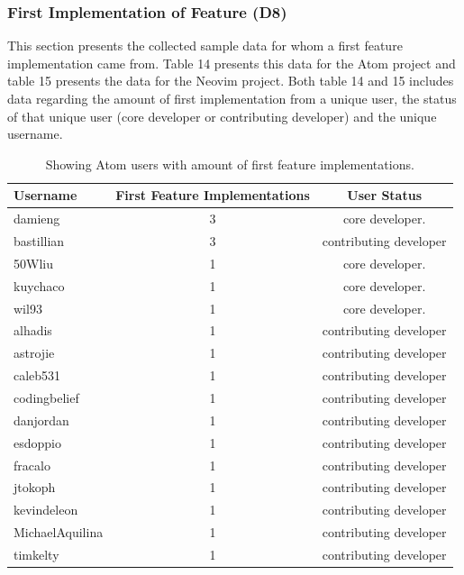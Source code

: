 \documentclass[a4paper,11pt]{article}
\begin{document}
{\FloatBarrier
\subsubsection{First Implementation of Feature (D8)}
This section presents the collected sample data for whom a first feature implementation came from. Table 14 presents this data for the Atom project and table 15 presents the data for the Neovim project. Both table 14 and 15 includes data regarding the amount of first implementation from a unique user, the status of that unique user (core developer or contributing developer) and the unique username.
\begin{table}[h]
	\centering
	\begin{tabular}{ | l | c | c |}
		\hline
		\textbf{Username} 	& \textbf{First Feature Implementations}	& \textbf{User Status}	\\\hline
		damieng 			& 3 								& core developer. 		\\\hline
		bastillian 			& 3 								& contributing developer	\\\hline
		50Wliu			& 1 								& core developer. 		\\\hline
		kuychaco 			& 1 								& core developer. 		\\\hline
		wil93 			& 1 								& core developer. 		\\\hline
		alhadis 			& 1 								& contributing developer	\\\hline
		astrojie 			& 1 								& contributing developer	\\\hline
		caleb531 			& 1 								& contributing developer	\\\hline
		codingbelief 		& 1 								& contributing developer	\\\hline
		danjordan 		& 1 								& contributing developer	\\\hline
		esdoppio 			& 1 								& contributing developer	\\\hline
		fracalo 			& 1 								& contributing developer	\\\hline
		jtokoph 			& 1 								& contributing developer	\\\hline
		kevindeleon 		& 1 								& contributing developer	\\\hline
		MichaelAquilina 	& 1 								& contributing developer	\\\hline
		timkelty 			& 1 								& contributing developer	\\
		\hline
	\end{tabular}
	\caption{Showing Atom users with amount of first feature implementations.}

\end{table}}
\end{document}
